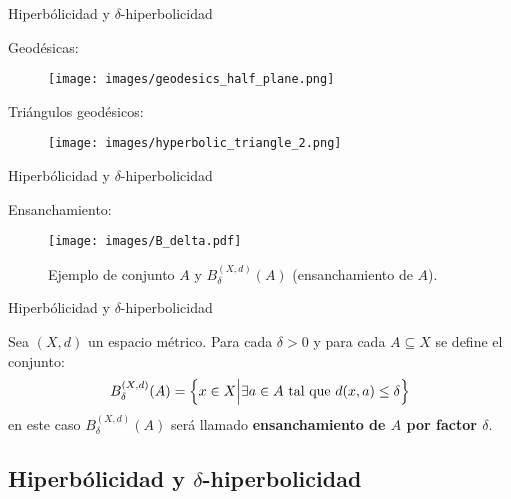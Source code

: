 \documentclass[xcolor=dvipsnames,aspectratio=159]{beamer}
\theoremstyle{largebreak}
\begin{document}
\begin{frame}{Hiperbólicidad y $\delta$-hiperbolicidad}
    \begin{center}
        Geodésicas:
    \end{center}
    \begin{figure}
        \begin{center}
            \texttt{[image: images/geodesics\_half\_plane.png]}
        \end{center}
    \end{figure}
    \pause
    \begin{center}
        Triángulos geodésicos:
    \end{center}
    \begin{figure}
        \begin{center}
            \texttt{[image: images/hyperbolic\_triangle\_2.png]}
        \end{center}
    \end{figure}
\end{frame}

\begin{frame}{Hiperbólicidad y $\delta$-hiperbolicidad}
    \begin{center}
        Ensanchamiento:
    \end{center}
    \begin{figure}
        \begin{center}
            \texttt{[image: images/B\_delta.pdf]}
        \end{center}
        \caption{Ejemplo de conjunto $A$ y $B_\delta^{(X,d)}(A)$ (ensanchamiento de $A$).}
    \end{figure}
\end{frame}

\begin{frame}{Hiperbólicidad y $\delta$-hiperbolicidad}
    \begin{mydef}
        Sea $(X,d)$ un espacio métrico. Para cada $\delta>0$ y para cada $A\subseteq X$ se define el conjunto:
        \begin{equation*}
            B_\delta^{(X,d)}(A)=\left\{x\in X\Big|\exists a\in A\textup{ tal que }d(x,a)\leq\delta \right\}
        \end{equation*}
        en este caso $B_\delta^{(X,d)}(A)$ será llamado \textbf{ensanchamiento de $A$ por factor $\delta$}.
    \end{mydef}
\end{frame}

\subsection{Hiperbólicidad y $\delta$-hiperbolicidad}
\end{document}
